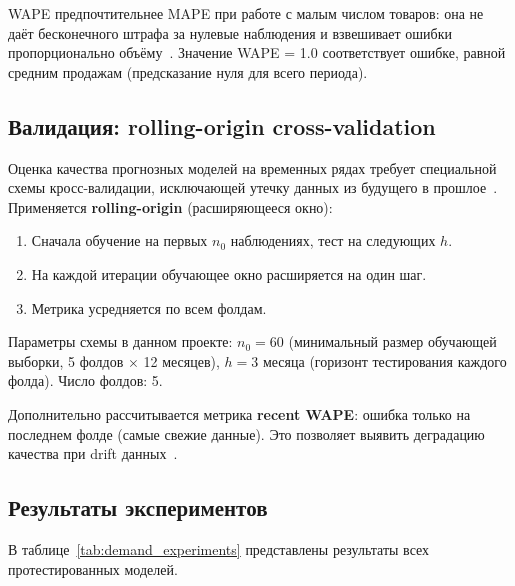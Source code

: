 WAPE предпочтительнее MAPE при работе с малым числом товаров: она не даёт бесконечного штрафа за нулевые наблюдения и взвешивает ошибки пропорционально объёму~\cite{makridakis2022m5}. Значение WAPE = 1.0 соответствует ошибке, равной средним продажам (предсказание нуля для всего периода).

\subsection{Валидация: rolling-origin cross-validation}

Оценка качества прогнозных моделей на временных рядах требует специальной схемы кросс-валидации, исключающей утечку данных из будущего в прошлое~\cite{bergmeir2018note}. Применяется \textbf{rolling-origin} (расширяющееся окно):

\begin{enumerate}
  \item Сначала обучение на первых $n_0$ наблюдениях, тест на следующих $h$.
  \item На каждой итерации обучающее окно расширяется на один шаг.
  \item Метрика усредняется по всем фолдам.
\end{enumerate}

Параметры схемы в данном проекте: $n_0 = 60$ (минимальный размер обучающей выборки, 5 фолдов $\times$ 12 месяцев), $h = 3$ месяца (горизонт тестирования каждого фолда). Число фолдов: 5.

Дополнительно рассчитывается метрика \textbf{recent WAPE}: ошибка только на последнем фолде (самые свежие данные). Это позволяет выявить деградацию качества при drift данных~\cite{widmer1996learning}.

\subsection{Результаты экспериментов}

В таблице~\ref{tab:demand_experiments} представлены результаты всех протестированных моделей.

